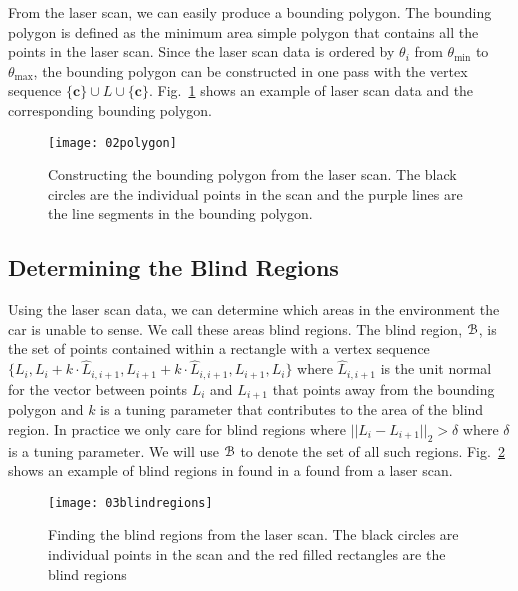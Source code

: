 From the laser scan, we can easily produce a bounding polygon. The bounding
polygon is defined as the minimum area simple polygon that contains all the
points in the laser scan. Since the laser scan data is ordered by $\theta_i$
from $\theta_{\min}$ to $\theta_{\max}$, the bounding polygon can be
constructed in one pass with the vertex sequence $\{\mathbf{c}\} \cup L \cup
\{\mathbf{c}\}$. Fig.~\ref{fig:polygon} shows an example of laser scan
data and the corresponding bounding polygon.

\begin{figure}[ht]

    \centering
    \texttt{[image: 02polygon]}

    \caption{Constructing the bounding polygon from the laser scan. The black
        circles are the individual points in the scan and the purple lines
        are the line segments in the bounding polygon.}

    \label{fig:polygon}
\end{figure}

\subsection{Determining the Blind Regions}

\label{sec:blindregions}

Using the laser scan data, we can determine which areas in the environment the
car is unable to sense. We call these areas blind regions. The blind region,
${{\mathcal{B}}}$, is the set of points contained within a rectangle with a vertex sequence
$\{L_i, L_i + k \cdot \hat{L}_{i, i + 1}, L_{i + 1} + k \cdot \hat{L}_{i, i +
1}, L_{i + 1}, L_i\}$ where $\hat{L}_{i, i + 1}$ is the unit normal for the
vector between points $L_i$ and $L_{i + 1}$ that points away from the bounding
polygon and $k$ is a tuning parameter that contributes to the area of the blind
region. In practice we only care for blind regions where $||L_i - L_{i + 1}||_2
> \delta$ where $\delta$ is a tuning parameter. We will use ${{\mathcal{B}}}$ to denote the
set of all such regions.  Fig.~\ref{fig:blindregions} shows an example of blind
regions in found in a found from a laser scan.

\begin{figure}[ht]

    \centering
    \texttt{[image: 03blindregions]}

    \caption{Finding the blind regions from the laser scan. The black circles
        are individual points in the scan and the red filled rectangles are the
        blind regions}

    \label{fig:blindregions}
\end{figure}

